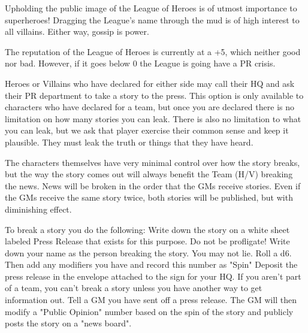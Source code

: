 \documentclass[green]{LRSguildcamp1}
\begin{document}
\name{\gPR{}}

Upholding the public image of the League of Heroes is of utmost importance to superheroes! 
Dragging the League's name through the mud is of high interest to all villains. Either way, gossip is power. 

The reputation of the League of Heroes is currently at a +5, which neither good nor bad. However, if it goes below 0 the League is going have a PR crisis. 

Heroes or Villains who have declared for either side may call their HQ and ask their PR department to take a story to the press. This option is only available to characters who have declared for a team, but once you are declared there is no limitation on how many stories you can leak. There is also no limitation to what you can leak, but we ask that player exercise their common sense and keep it plausible. They must leak the truth or things that they have heard. 

The characters themselves have very minimal control over how the story breaks, but the way the story comes out will always benefit the Team (H/V) breaking the news. News will be broken in the order that the GMs receive stories. Even if the GMs receive the same story twice, both stories will be published, but with diminishing effect. 

To break a story you do the following:
Write down the story on a white sheet labeled Press Release that exists for this purpose. Do not be profligate! 
Write down your name as the person breaking the story. You may not lie. 
Roll a d6. Then add any modifiers you have and record this number as "Spin"
Deposit the press release in the envelope attached to the sign for your HQ. If you aren't part of a team, you can't break a story unless you have another way to get information out. 
Tell a GM you have sent off a press release.
The GM will then modify a "Public Opinion" number based on the spin of the story and publicly posts the story on a "news board".

\end{document}
